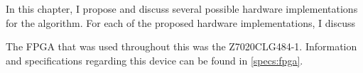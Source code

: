 In this chapter, I propose and discuss several possible hardware implementations
for the  algorithm. For each of
the proposed hardware implementations, I discuss

The \gls{FPGA} that was used throughout this \thesis{} was the \Xilinx{}
Z7020CLG484-1. Information and specifications regarding this device can be found
in \autoref{specs:fpga}.
